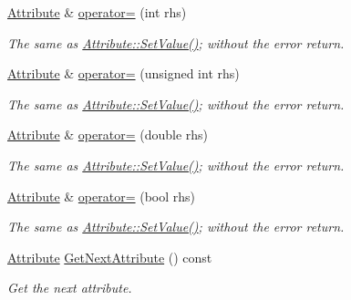 \begin{DoxyCompactItemize}
\hyperlink{classphys_1_1xml_1_1Attribute}{Attribute} \& \hyperlink{classphys_1_1xml_1_1Attribute_ac9a18c2b6c4bfc0cdfe4eede938a91fe}{operator=} (int rhs)
\begin{DoxyCompactList}\small\item\em The same as \hyperlink{classphys_1_1xml_1_1Attribute_a470512fcd8b4f7609319bf85df100aaa}{Attribute::SetValue()}; without the error return. \item\end{DoxyCompactList}\item 
\hyperlink{classphys_1_1xml_1_1Attribute}{Attribute} \& \hyperlink{classphys_1_1xml_1_1Attribute_af6b6e5202b23be948b986cb0bcdf5da8}{operator=} (unsigned int rhs)
\begin{DoxyCompactList}\small\item\em The same as \hyperlink{classphys_1_1xml_1_1Attribute_a470512fcd8b4f7609319bf85df100aaa}{Attribute::SetValue()}; without the error return. \item\end{DoxyCompactList}\item 
\hyperlink{classphys_1_1xml_1_1Attribute}{Attribute} \& \hyperlink{classphys_1_1xml_1_1Attribute_ac92a92492d624984a52b64bc4fabf355}{operator=} (double rhs)
\begin{DoxyCompactList}\small\item\em The same as \hyperlink{classphys_1_1xml_1_1Attribute_a470512fcd8b4f7609319bf85df100aaa}{Attribute::SetValue()}; without the error return. \item\end{DoxyCompactList}\item 
\hyperlink{classphys_1_1xml_1_1Attribute}{Attribute} \& \hyperlink{classphys_1_1xml_1_1Attribute_a008397ad3c9c63bf27a4dca4b68e5efd}{operator=} (bool rhs)
\begin{DoxyCompactList}\small\item\em The same as \hyperlink{classphys_1_1xml_1_1Attribute_a470512fcd8b4f7609319bf85df100aaa}{Attribute::SetValue()}; without the error return. \item\end{DoxyCompactList}\item 
\hyperlink{classphys_1_1xml_1_1Attribute}{Attribute} \hyperlink{classphys_1_1xml_1_1Attribute_a602c51cb79ed0cc33bd898aefe77da70}{GetNextAttribute} () const 
\begin{DoxyCompactList}\small\item\em Get the next attribute. \item\end{DoxyCompactList}\item 

\end{DoxyCompactItemize}
